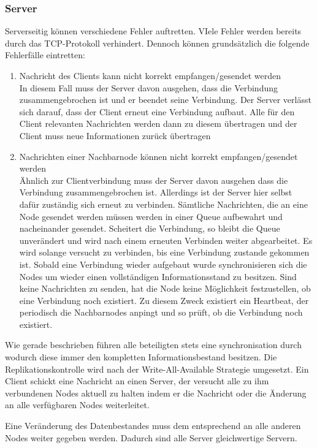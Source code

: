 \subsubsection{Server}
Serverseitig können verschiedene Fehler auftretten. VIele Fehler werden bereits durch das TCP-Protokoll verhindert.
Dennoch können grundsätzlich die folgende Fehlerfälle eintretten:
\begin{enumerate}
    \item Nachricht des Clients kann nicht korrekt empfangen/gesendet werden\\
        In diesem Fall muss der Server davon ausgehen, dass die Verbindung zusammengebrochen ist und er beendet
        seine Verbindung. Der Server verlässt sich darauf, dass der Client erneut eine Verbindung aufbaut.
        Alle für den Client relevanten Nachrichten werden dann zu diesem übertragen und der Client muss
        neue Informationen zurück übertragen
    \item Nachrichten einer Nachbarnode können nicht korrekt empfangen/gesendet werden\\
        Ähnlich zur Clientverbindung muss der Server davon ausgehen dass die Verbindung zusammengebrochen ist.
        Allerdings ist der Server hier selbst dafür zuständig sich erneut zu verbinden. Sämtliche Nachrichten,
        die an eine Node gesendet werden müssen werden in einer Queue aufbewahrt und nacheinander gesendet.
        Scheitert die Verbindung, so bleibt die Queue unverändert und wird nach einem erneuten Verbinden
        weiter abgearbeitet. Es wird solange versucht zu verbinden, bis eine Verbindung zustande gekommen ist.
        Sobald eine Verbindung wieder aufgebaut wurde synchronisieren sich die Nodes um wieder einen vollständigen
        Informationsstand zu besitzen.
        Sind keine Nachrichten zu senden, hat die Node keine Möglichkeit festzustellen,
        ob eine Verbindung noch existiert. Zu diesem Zweck existiert ein Heartbeat, der periodisch
        die Nachbarnodes anpingt und so prüft, ob die Verbindung noch existiert.
\end{enumerate}
Wie gerade beschrieben führen alle beteiligten stets eine synchronisation durch wodurch diese immer den kompletten Informationsbestand besitzen. Die Replikationskontrolle wird nach der Write-All-Available Strategie umgesetzt. Ein Client schickt eine Nachricht an einen Server, der versucht alle zu ihm verbundenen Nodes aktuell zu halten indem er die Nachricht oder die Änderung an alle verfügbaren Nodes weiterleitet.

Eine Veränderung des Datenbestandes muss dem entsprechend an alle anderen Nodes weiter gegeben werden.
Dadurch sind alle Server gleichwertige Servern.




